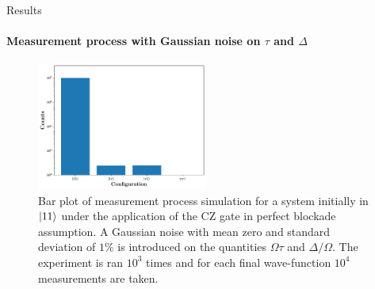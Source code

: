 \documentclass[8pt]{beamer}
\begin{document}
 	\begin{frame}{Results}
	\framesubtitle{Measurement process with Gaussian noise on $\tau$ and $\Delta$}  
	
        \begin{center}	
        \end{center}

        \begin{figure}[H]
            \centering
            \includegraphics[width=0.5\textwidth]{images/two-qubit-system/measurement/noise_measurement_two-qubit.pdf}
            \caption{Bar plot of measurement process simulation for a system initially in $\ket{11}$ under the application of the CZ gate in perfect blockade assumption. A Gaussian noise with mean zero and standard deviation of $1\%$ is introduced on the quantities $\Omega\tau$ and $\Delta/\Omega$. The experiment is ran $10^3$ times and for each final wave-function $10^4$ measurements are taken.}
            \label{fig:measurement_perfect-blockade}
        \end{figure}	
	
	\end{frame}
	
\end{document}
